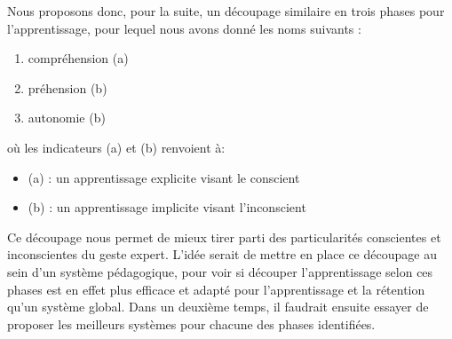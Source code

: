 Nous proposons donc, pour la suite, un découpage similaire en trois phases pour l'apprentissage, pour lequel nous avons donné les noms suivants :
\begin{enumerate}
    \item compréhension (a)
    \item préhension (b)
    \item autonomie (b)
\end{enumerate}

où les indicateurs (a) et (b) renvoient à:
\begin{itemize}
    \item (a) : un apprentissage explicite visant le conscient
    \item (b) : un apprentissage implicite visant l'inconscient
\end{itemize} 

Ce découpage nous permet de mieux tirer parti des particularités conscientes et inconscientes du geste expert. 
L'idée serait de mettre en place ce découpage au sein d'un système pédagogique, pour voir si découper l'apprentissage selon ces phases est en effet plus efficace et adapté pour l'apprentissage et la rétention qu'un système global.
Dans un deuxième temps, il faudrait ensuite essayer de proposer les meilleurs systèmes pour chacune des phases identifiées. 